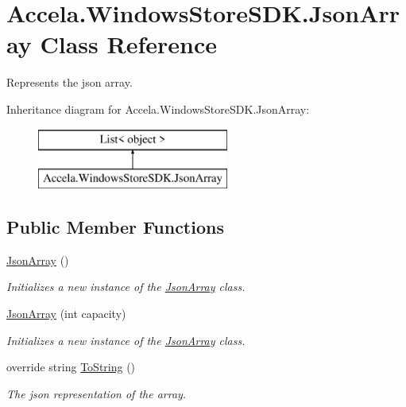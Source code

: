\hypertarget{class_accela_1_1_windows_store_s_d_k_1_1_json_array}{\section{Accela.\+Windows\+Store\+S\+D\+K.\+Json\+Array Class Reference}
\label{class_accela_1_1_windows_store_s_d_k_1_1_json_array}
}


Represents the json array.  


Inheritance diagram for Accela.\+Windows\+Store\+S\+D\+K.\+Json\+Array\+:\begin{figure}[H]
\begin{center}
\leavevmode
\includegraphics[height=2.000000cm]{class_accela_1_1_windows_store_s_d_k_1_1_json_array}
\end{center}
\end{figure}
\subsection*{Public Member Functions}
\begin{DoxyCompactItemize}
\item 
\hyperlink{class_accela_1_1_windows_store_s_d_k_1_1_json_array_aa21743845479488eb2d4426f26bb4a0d}{Json\+Array} ()
\begin{DoxyCompactList}\small\item\em Initializes a new instance of the \hyperlink{class_accela_1_1_windows_store_s_d_k_1_1_json_array}{Json\+Array} class. \end{DoxyCompactList}\item 
\hyperlink{class_accela_1_1_windows_store_s_d_k_1_1_json_array_a2137e46361b74b4d48b894f8088a4ae1}{Json\+Array} (int capacity)
\begin{DoxyCompactList}\small\item\em Initializes a new instance of the \hyperlink{class_accela_1_1_windows_store_s_d_k_1_1_json_array}{Json\+Array} class. \end{DoxyCompactList}\item 
override string \hyperlink{class_accela_1_1_windows_store_s_d_k_1_1_json_array_a16e42f4e68756a88d3c8c49aa1e709d9}{To\+String} ()
\begin{DoxyCompactList}\small\item\em The json representation of the array. \end{DoxyCompactList}\end{DoxyCompactItemize}


